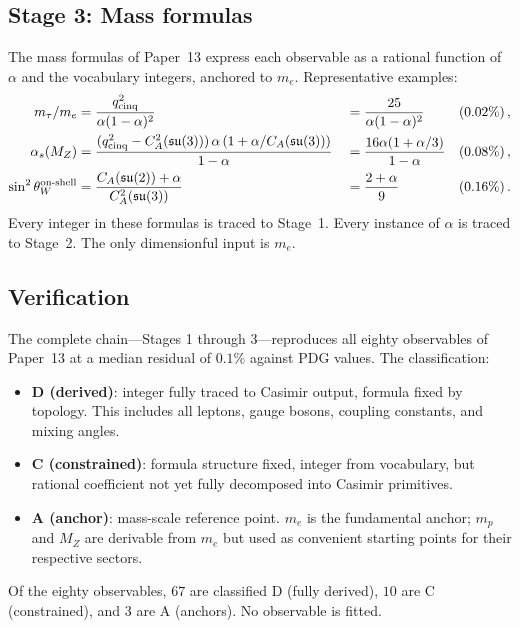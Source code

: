 \documentclass[11pt]{article}
\newcommand{\su}{\mathfrak{su}}
\newcommand{\CA}{C_A}
\begin{document}
\subsection{Stage 3: Mass formulas}

The mass formulas of Paper~13 express each observable as a
rational function of $\alpha$ and the vocabulary integers, anchored
to $m_e$.  Representative examples:
\begin{align}
  m_\tau/m_e &= \frac{q_\text{cinq}^2}
    {\alpha(1-\alpha)^2}
  &&= \frac{25}{\alpha(1-\alpha)^2}
  &&\text{($0.02\%$)}\,,\notag\\
  \alpha_s(M_Z) &=
    \frac{(q_\text{cinq}^2 - \CA^2(\su(3)))\,\alpha\,
          (1+\alpha/\CA(\su(3)))}
         {1-\alpha}
  &&= \frac{16\alpha(1+\alpha/3)}{1-\alpha}
  &&\text{($0.08\%$)}\,,\notag\\
  \sin^2\theta_W^{\text{on-shell}}
    &= \frac{\CA(\su(2)) + \alpha}
    {\CA^2(\su(3))}
  &&= \frac{2+\alpha}{9}
  &&\text{($0.16\%$)}\,.\label{eq:examples}
\end{align}
Every integer in these formulas is traced to Stage~1.
Every instance of $\alpha$ is traced to Stage~2.
The only dimensionful input is $m_e$.

\subsection{Verification}

The complete chain---Stages 1 through 3---reproduces all eighty
observables of Paper~13 at a median residual of $0.1\%$ against
PDG values.  The classification:

\begin{itemize}\setlength\itemsep{0pt}
  \item \textbf{D (derived)}: integer fully traced to Casimir
    output, formula fixed by topology.  This includes all leptons,
    gauge bosons, coupling constants, and mixing angles.
  \item \textbf{C (constrained)}: formula structure fixed,
    integer from vocabulary, but rational coefficient not yet
    fully decomposed into Casimir primitives.
  \item \textbf{A (anchor)}: mass-scale reference point.
    $m_e$ is the fundamental anchor; $m_p$ and $M_Z$ are
    derivable from $m_e$ but used as convenient starting points
    for their respective sectors.
\end{itemize}

Of the eighty observables, $67$ are classified D (fully derived),
$10$ are C (constrained), and $3$ are A (anchors).  No observable
is fitted.
\end{document}

